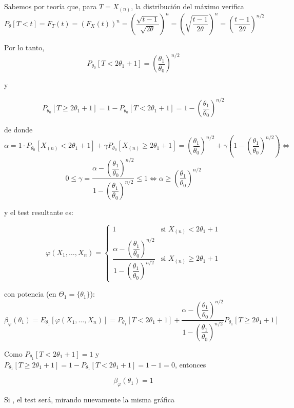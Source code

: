 \documentclass[12pt]{article}
\begin{document}
\begin{ejercicio}
        Sabemos por teoría que, para $T = X_{(n)}$, la distribución del máximo verifica $$P_{\theta}[T<t] = F_T(t) = (F_X(t))^n = \left( \dfrac{\sqrt{t-1}}{\sqrt{2\theta}} \right)^{n} = \left( \sqrt{\dfrac{t-1}{2\theta}} \right)^{n} = 
        \left( \dfrac{t-1}{2\theta} \right)^{n/2}$$

        Por lo tanto, $$P_{\theta_0}[T < 2\theta_1 + 1] = \left( \dfrac{\theta_1}{\theta_0} \right)^{n/2}$$

        y

        $$P_{\theta_0}[T \geq 2\theta_1 + 1] = 1 - P_{\theta_0}[T < 2\theta_1 + 1] = 1 - \left( \dfrac{\theta_1}{\theta_0} \right)^{n/2}$$

        de donde
        $$\alpha = 1 \cdot P_{\theta_0}[X_{(n)} < 2\theta_1 + 1] + 
        \gamma P_{\theta_0}[X_{(n)} \geq 2\theta_1 + 1] = \left( \dfrac{\theta_1}{\theta_0} \right)^{n/2} + \gamma \left( 1 - \left( \dfrac{\theta_1}{\theta_0} \right)^{n/2} \right) \iff $$
        $$0 \leq \gamma = \dfrac{\alpha - \left( \dfrac{\theta_1}{\theta_0} \right)^{n/2}}{1 - \left( \dfrac{\theta_1}{\theta_0} \right)^{n/2}} \leq 1 \iff \alpha \geq \left( \dfrac{\theta_1}{\theta_0} \right)^{n/2}$$

        y el test resultante es:

        $$\varphi(X_1, \ldots, X_n) = 
            \begin{cases}
                1 &\text{si } X_{(n)} < 2\theta_1 + 1 \\
                \dfrac{\alpha - \left( \dfrac{\theta_1}{\theta_0} \right)^{n/2}}{1 - \left( \dfrac{\theta_1}{\theta_0} \right)^{n/2}} &\text{si } X_{(n)} \geq 2\theta_1 + 1
            \end{cases}$$      
            
        con potencia (en $\Theta_1 = \{\theta_1\}$):
        $$\beta_{\varphi}(\theta_1) = E_{\theta_1}[\varphi(X_1, \ldots, X_n)] = P_{\theta_1}[T < 2\theta_1 + 1] + 
        \dfrac{\alpha - \left( \dfrac{\theta_1}{\theta_0} \right)^{n/2}}{1 - \left( \dfrac{\theta_1}{\theta_0} \right)^{n/2}} P_{\theta_1}[T \geq 2\theta_1 + 1]$$

        Como $P_{\theta_1}[T < 2\theta_1 + 1] = 1$ y $P_{\theta_1}[T \geq 2\theta_1 + 1] = 1 - P_{\theta_1}[T < 2\theta_1 + 1] = 1 - 1 = 0$, entonces

        $$\beta_{\varphi}(\theta_1) = 1$$

        \newpage

        Si , el test será, mirando nuevamente la misma gráfica


\end{ejercicio}
\end{document}
